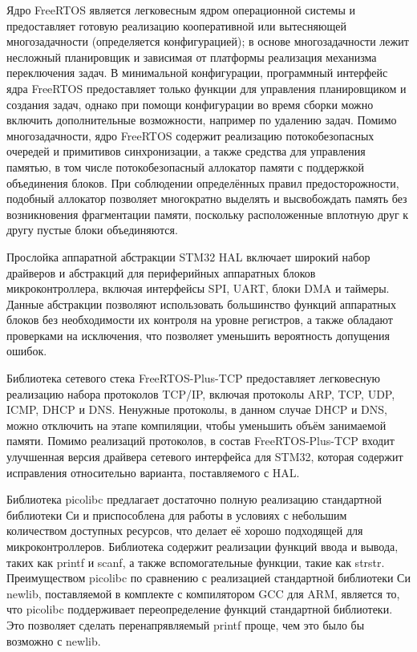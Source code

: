 \documentclass{report}
\begin{document}
Ядро FreeRTOS является легковесным ядром операционной системы и предоставляет готовую реализацию кооперативной или вытесняющей многозадачности (определяется конфигурацией); в основе многозадачности лежит несложный планировщик и зависимая от платформы реализация механизма переключения задач. В минимальной конфигурации, программный интерфейс ядра FreeRTOS предоставляет только функции для управления планировщиком и создания задач, однако при помощи конфигурации во время сборки можно включить дополнительные возможности, например по удалению задач. Помимо многозадачности, ядро FreeRTOS содержит реализацию потокобезопасных очередей и примитивов синхронизации, а также средства для управления памятью, в том числе потокобезопасный аллокатор памяти с поддержкой объединения блоков. При соблюдении определённых правил предосторожности, подобный аллокатор позволяет многократно выделять и высвобождать память без возникновения фрагментации памяти, поскольку расположенные вплотную друг к другу пустые блоки объединяются.

Прослойка аппаратной абстракции STM32 HAL включает широкий набор драйверов и абстракций для периферийных аппаратных блоков микроконтроллера, включая интерфейсы SPI, UART, блоки DMA и таймеры. Данные абстракции позволяют использовать большинство функций аппаратных блоков без необходимости их контроля на уровне регистров, а также обладают проверками на исключения, что позволяет уменьшить вероятность допущения ошибок.

Библиотека сетевого стека FreeRTOS-Plus-TCP предоставляет легковесную реализацию набора протоколов TCP/IP, включая протоколы ARP, TCP, UDP, ICMP, DHCP и DNS. Ненужные протоколы, в данном случае DHCP и DNS, можно отключить на этапе компиляции, чтобы уменьшить объём занимаемой памяти. Помимо реализаций протоколов, в состав FreeRTOS-Plus-TCP входит улучшенная версия драйвера сетевого интерфейса для STM32, которая содержит исправления относительно варианта, поставляемого с HAL.

Библиотека picolibc предлагает достаточно полную реализацию стандартной библиотеки Си и приспособлена для работы в условиях с небольшим количеством доступных ресурсов, что делает её хорошо подходящей для микроконтроллеров. Библиотека содержит реализации функций ввода и вывода, таких как printf и scanf, а также вспомогательные функции, такие как strstr. Преимуществом picolibc по сравнению с реализацией стандартной библиотеки Си newlib, поставляемой в комплекте с компилятором GCC для ARM, является то, что picolibc поддерживает переопределение функций стандартной библиотеки. Это позволяет сделать перенапрявляемый printf проще, чем это было бы возможно с newlib.
\end{document}
